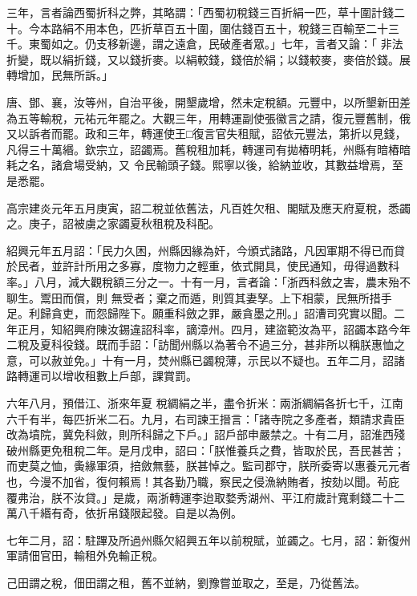 \begin{pinyinscope}
 三年，言者論西蜀折科之弊，其略謂：「西蜀初稅錢三百折絹一匹，草十圍計錢二十。今本路絹不用本色，匹折草百五十圍，圍估錢百五十，稅錢三百輸至二十三千。東蜀如之。仍支移新邊，謂之遠倉，民破產者眾。」七年，言者又論：「
 非法折變，既以絹折錢，又以錢折麥。以絹較錢，錢倍於絹；以錢較麥，麥倍於錢。展轉增加，民無所訴。」



 唐、鄧、襄，汝等州，自治平後，開墾歲增，然未定稅額。元豐中，以所墾新田差為五等輸稅，元祐元年罷之。大觀三年，用轉運副使張徽言之請，復元豐舊制，俄又以訴者而罷。政和三年，轉運使王□復言官失租賦，詔依元豐法，第折以見錢，凡得三十萬緡。欽宗立，詔蠲焉。舊稅租加耗，轉運司有拋樁明耗，州縣有暗樁暗耗之名，諸倉場受納，又
 令民輸頭子錢。熙寧以後，給納並收，其數益增焉，至是悉罷。



 高宗建炎元年五月庚寅，詔二稅並依舊法，凡百姓欠租、閣賦及應天府夏稅，悉蠲之。庚子，詔被虜之家蠲夏秋租稅及科配。



 紹興元年五月詔：「民力久困，州縣因緣為奸，今頒式諸路，凡因軍期不得已而貸於民者，並許計所用之多寡，度物力之輕重，依式開具，使民通知，毋得過數科率。」八月，減大觀稅額三分之一。十有一月，言者論：「浙西科斂之害，農末殆不聊生。鬻田而償，則
 無受者；棄之而遁，則質其妻孥。上下相蒙，民無所措手足。利歸貪吏，而怨歸陛下。願重科斂之罪，嚴貪墨之刑。」詔漕司究實以聞。二年正月，知紹興府陳汝錫違詔科率，謫漳州。四月，建盜範汝為平，詔蠲本路今年二稅及夏科役錢。既而手詔：「訪聞州縣以為著令不過三分，甚非所以稱朕惠恤之意，可以赦並免。」十有一月，焚州縣已蠲稅薄，示民以不疑也。五年二月，詔諸路轉運司以增收租數上戶部，課賞罰。



 六年八月，預借江、浙來年夏
 稅綢絹之半，盡令折米：兩浙綢絹各折七千，江南六千有半，每匹折米二石。九月，右司諫王搢言：「諸寺院之多產者，類請求貴臣改為墳院，冀免科斂，則所科歸之下戶。」詔戶部申嚴禁之。十有二月，詔淮西殘破州縣更免租稅二年。是月戊申，詔曰：「朕惟養兵之費，皆取於民，吾民甚苦；而吏莫之恤，夤緣軍須，掊斂無藝，朕甚悼之。監司郡守，朕所委寄以惠養元元者也，今漫不加省，復何賴焉！其各勤乃職，察民之侵漁納賄者，按劾以聞。茍庇
 覆弗治，朕不汝貸。」是歲，兩浙轉運李迨取婺秀湖州、平江府歲計寬剩錢二十二萬八千緡有奇，依折帛錢限起發。自是以為例。



 七年二月，詔：駐蹕及所過州縣欠紹興五年以前稅賦，並蠲之。七月，詔：新復州軍請佃官田，輸租外免輸正稅。



 己田謂之稅，佃田謂之租，舊不並納，劉豫嘗並取之，至是，乃從舊法。




\end{pinyinscope}
